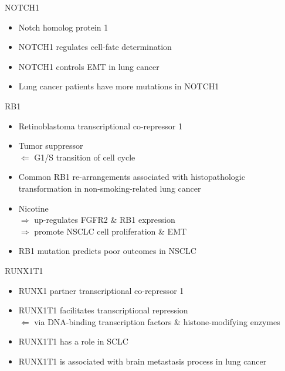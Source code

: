 \documentclass{beamer}
\begin{document}
\begin{frame}[allowframebreaks]
                \begin{block}{NOTCH1}
                    \begin{itemize}
                        \item Notch homolog protein 1
                        \item NOTCH1 regulates cell-fate determination \cite{NOTCH1-01, NOTCH1-02}
                        \item NOTCH1 controls EMT in lung cancer \cite{NOTCH1-03}
                        \item Lung cancer patients have more mutations in NOTCH1 \cite{NOTCH1-04}
                    \end{itemize}
                \end{block}

                \begin{block}{RB1}
                    \begin{itemize}
                        \item Retinoblastoma transcriptional co-repressor 1
                        \item Tumor suppressor \\
                            $\Leftarrow$ G1/S transition of cell cycle \cite{RB1-01}
                        \item Common RB1 re-arrangements associated with histopathologic transformation in non-smoking-related lung cancer \cite{RB1-02}
                        \item Nicotine \\
                            $\Rightarrow$ up-regulates FGFR2 \& RB1 expression \\
                            $\Rightarrow$ promote NSCLC cell proliferation \& EMT \cite{RB1-03}
                        \item RB1 mutation predicts poor outcomes in NSCLC \cite{RB1-04}
                    \end{itemize}
                \end{block}

                \begin{block}{RUNX1T1}
                    \begin{itemize}
                        \item RUNX1 partner transcriptional co-repressor 1
                        \item RUNX1T1 facilitates transcriptional repression \\
                            $\Leftarrow$ via DNA-binding transcription factors \& histone-modifying enzymes \cite{RUNX1T1-01, RUNX1T1-02}
                        \item RUNX1T1 has a role in SCLC \cite{RUNX1T1-03}
                        \item RUNX1T1 is associated with brain metastasis process in lung cancer \cite{RUNX1T1-04}
                    \end{itemize}
                \end{block}


\end{frame}
\end{document}
